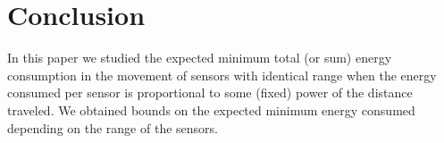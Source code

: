 \documentclass[final,5p,times,twocolumn]{elsarticle_mod}
\begin{document}
\section{Conclusion}
\label{conclusion}
In this paper
we studied the expected minimum total (or sum) energy consumption in the movement of sensors with identical range when the energy consumed per sensor is proportional to some (fixed) power of the distance traveled. We obtained bounds on the expected minimum energy consumed 
depending on the range of the sensors. 

\end{document}
